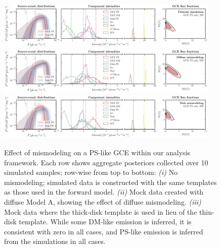 \documentclass[prd,aps,10pt,nofootinbib,twocolumn,superscriptaddress,preprintnumbers,balancelastpage,longbibliography]{revtex4-1}
\begin{document}
%
\begin{figure}
\centering
\includegraphics[width=0.95\textwidth]{plots/sim_sbi_ps_agg.pdf}
\includegraphics[width=0.95\textwidth]{plots/sim_sbi_modelA_ps.pdf}
\includegraphics[width=0.95\textwidth]{plots/sim_sbi_thick_disk_mm_ps.pdf}
\caption{Effect of mismodeling on a PS-like GCE within our analysis framework. Each row shows aggregate posteriors collected over 10 simulated samples; row-wise from top to bottom: \emph{(i)} No mismodeling; simulated data is constructed with the same templates as those used in the forward model. \emph{(ii)} Mock data created with diffuse Model A, showing the effect of diffuse mismodeling. \emph{(iii)} Mock data where the thick-disk template is used in lieu of the thin-disk template. While some DM-like emission is inferred, it is consistent with zero in all cases, and PS-like emission is inferred from the simulations in all cases.}
\label{fig:sim_sbi_mismo_ps}
\end{figure}
%
\end{document}
